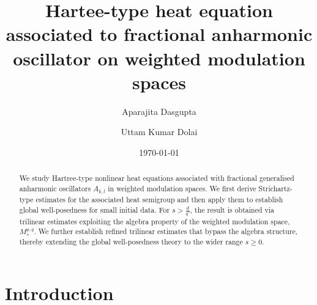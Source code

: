\documentclass[12pt,reqno,a4paper]{amsart}
\title[Hartee equation for anharmonic oscillator ]{Hartee-type heat equation associated to fractional anharmonic oscillator on weighted modulation spaces}
\author{Aparajita Dasgupta}
\author{Uttam Kumar Dolai}
\date{\today}
\numberwithin{equation}{section}
\theoremstyle{plain}
\theoremstyle{definition}
\theoremstyle{remark}
\begin{document}



\begin{abstract}
We study Hartree-type nonlinear heat equations associated with fractional generalised anharmonic oscillators \(A_{k,l}\) in weighted modulation spaces. We first derive Strichartz-type estimates for the associated heat semigroup and then apply them to establish global well-posedness for small initial data. For \(s>\frac{d}{q'}\), the result is obtained via trilinear estimates exploiting the algebra property of the weighted modulation space, \(M^{p,q}_s\). We further establish refined trilinear estimates that bypass the algebra structure, thereby extending the global well-posedness theory to the wider range \(s\ge 0\).
\end{abstract}




	
	\maketitle
	
	
	\allowdisplaybreaks
	
	
	

	\tableofcontents 
\section{Introduction}
\end{document}
